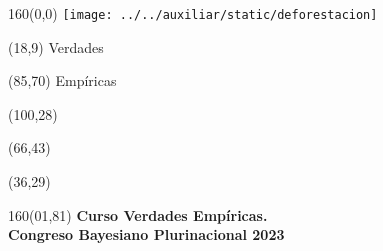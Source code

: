 \documentclass[shownotes,aspectratio=169]{beamer}
\begin{document}
\begin{frame}


\begin{textblock}{160}(0,0)
\texttt{[image: ../../auxiliar/static/deforestacion]}
\end{textblock}

\begin{textblock}{80}(18,9)
\textcolor{black!15}{\fontsize{44}{55}\selectfont Verdades}
\end{textblock}

\begin{textblock}{47}(85,70)
\centering \textcolor{black!15}{{\fontsize{52}{65}\selectfont Empíricas}}
\end{textblock}

\begin{textblock}{80}(100,28)
\LARGE  \textcolor{black!15}{}
\end{textblock}

\begin{textblock}{80}(66,43)
\LARGE  \textcolor{black!15}{\scalebox{6}{$=$}}
\end{textblock}

\begin{textblock}{80}(36,29)
\LARGE  \textcolor{black!15}{\scalebox{9}{$p$}}
\end{textblock}

\vspace{2cm}
\maketitle



\begin{textblock}{160}(01,81)
\footnotesize \textcolor{black!5}{\textbf{Curso Verdades Empíricas. \\
Congreso Bayesiano Plurinacional 2023} \\}
\end{textblock}

\end{frame}
\end{document}
